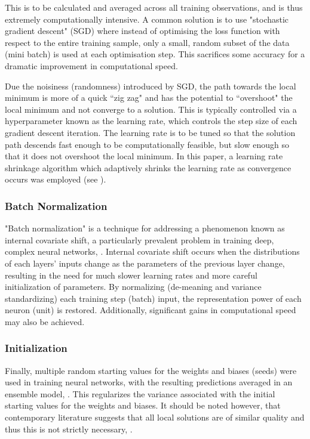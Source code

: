\documentclass[a4paper]{article}
\begin{document}
	This is to be calculated and averaged across all training observations, and is thus extremely computationally intensive. A common solution is to use "stochastic gradient descent" (SGD) where instead of optimising the loss function with respect to the entire training sample, only a small, random subset of the data (mini batch) is used at each optimisation step. This sacrifices some accuracy for a dramatic improvement in computational speed.
	
	Due the noisiness (randomness) introduced by SGD, the path towards the local minimum is more of a quick ``zig zag" and has the potential to ``overshoot" the local minimum and not converge to a solution. This is typically controlled via a hyperparameter known as the learning rate, which controls the step size of each gradient descent iteration. The learning rate is to be tuned so that the solution path descends fast enough to be computationally feasible, but slow enough so that it does not overshoot the local minimum. In this paper, a learning rate shrinkage algorithm which adaptively shrinks the learning rate as convergence occurs was employed (see \cite{kingma_adam:_2014}).
	
	\subsubsection{Batch Normalization}
	
	"Batch normalization" is a technique for addressing a phenomenon known as internal covariate shift, a particularly prevalent problem in training deep, complex neural networks, \citep{ioffe_batch_2015}. Internal covariate shift occurs when the distributions of each layers' inputs change as the parameters of the previous layer change, resulting in the need for much slower learning rates and more careful initialization of parameters. By normalizing (de-meaning and variance standardizing) each training step (batch) input, the representation power of each neuron (unit) is restored. Additionally, significant gains in computational speed may also be achieved.
	
	\subsubsection{Initialization}
	
	Finally, multiple random starting values for the weights and biases (seeds) were used in training neural networks, with the resulting predictions averaged in an ensemble model, \cite{hansen_neural_1990}. This regularizes the variance associated with the initial starting values for the weights and biases. It should be noted however, that contemporary literature suggests that all local solutions are of similar quality and thus this is not strictly necessary, \citep{choromanska_loss_2014}.
	
\end{document}
